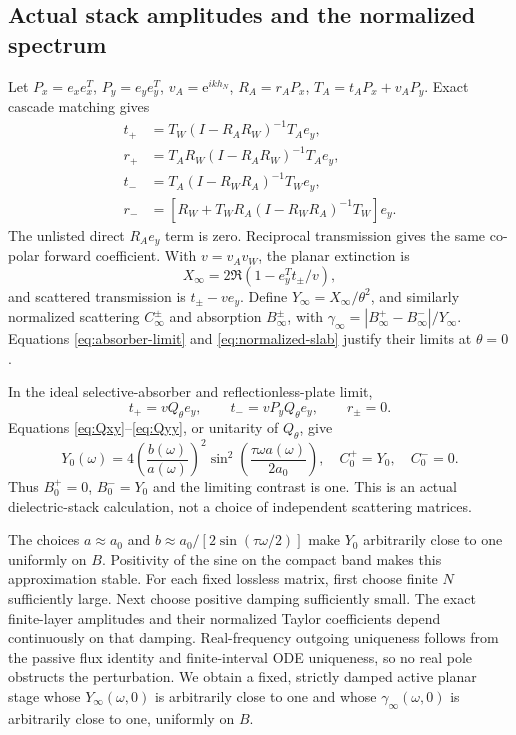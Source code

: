 \documentclass[11pt]{article}
\newcommand{\abs}[1]{\left|#1\right|}
\newcommand{\ex}{e_x}
\newcommand{\ey}{e_y}
\newcommand{\ee}{\mathrm e}
\begin{document}
\subsection{Actual stack amplitudes and the normalized spectrum}
Let $P_x=\ex\ex^T$, $P_y=\ey\ey^T$, $v_A=\ee^{ikh_N}$,
$R_A=r_AP_x$, $T_A=t_AP_x+v_AP_y$. Exact cascade matching gives
\begin{align*}
 t_+&=T_W(I-R_AR_W)^{-1}T_A\ey,\\
 r_+&=T_AR_W(I-R_AR_W)^{-1}T_A\ey,\\
 t_-&=T_A(I-R_WR_A)^{-1}T_W\ey,\\
 r_-&=\left[R_W+T_WR_A(I-R_WR_A)^{-1}T_W\right]\ey.
\end{align*}
The unlisted direct $R_A\ey$ term is zero. Reciprocal transmission gives the
same co-polar forward coefficient. With $v=v_Av_W$, the planar extinction is
\[
 X_\infty=2\Re(1-\ey^Tt_\pm/v),
\]
and scattered transmission is $t_\pm-v\ey$. Define
$Y_\infty=X_\infty/\theta^2$, and similarly normalized scattering
$C_\infty^\pm$ and absorption $B_\infty^\pm$, with
$\gamma_\infty=\abs{B_\infty^+-B_\infty^-}/Y_\infty$.
Equations \eqref{eq:absorber-limit} and \eqref{eq:normalized-slab} justify their
limits at $\theta=0$.

In the ideal selective-absorber and reflectionless-plate limit,
\[
 t_+=vQ_\theta\ey,\qquad t_-=vP_yQ_\theta\ey,\qquad r_\pm=0.
\]
Equations \eqref{eq:Qxy}--\eqref{eq:Qyy}, or unitarity of $Q_\theta$, give
\begin{equation}\label{eq:flat-limit}
 Y_0(\omega)=4\left(\frac{b(\omega)}{a(\omega)}\right)^2
          \sin^2\!\left(\frac{\tau\omega a(\omega)}{2a_0}\right),
 \quad C_0^+=Y_0,\quad C_0^-=0.
\end{equation}
Thus $B_0^+=0$, $B_0^-=Y_0$ and the limiting contrast is one.
This is an actual dielectric-stack calculation, not a choice of independent
scattering matrices.

The choices $a\approx a_0$ and
$b\approx a_0/[2\sin(\tau\omega/2)]$ make $Y_0$ arbitrarily close to one
uniformly on $B$. Positivity of the sine on the compact band makes this
approximation stable. For each fixed lossless matrix, first choose finite
$N$ sufficiently large. Next choose positive damping sufficiently small.
The exact finite-layer amplitudes and their normalized Taylor coefficients
depend continuously on that damping. Real-frequency outgoing uniqueness
follows from the passive flux identity and finite-interval ODE uniqueness,
so no real pole obstructs the perturbation. We obtain a fixed, strictly
damped active planar stage whose $Y_\infty(\omega,0)$ is arbitrarily close
to one and whose $\gamma_\infty(\omega,0)$ is arbitrarily close to one,
uniformly on $B$.
\end{document}

